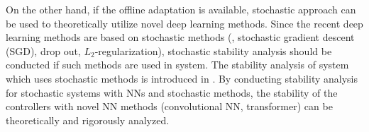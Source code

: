 On the other hand, if the offline adaptation is available, stochastic approach can be used to theoretically utilize novel deep learning methods.
Since the recent deep learning methods are based on stochastic methods (\eg, stochastic gradient descent (SGD), drop out, $L_2$-regularization), stochastic stability analysis should be conducted if such methods are used in system.
The stability analysis of system which uses stochastic methods is introduced in \cite{RN122,RN123}.
By conducting stability analysis for stochastic systems with NNs and stochastic methods, the stability of the controllers with novel NN methods (\eg convolutional NN, transformer) can be theoretically and rigorously analyzed. 


